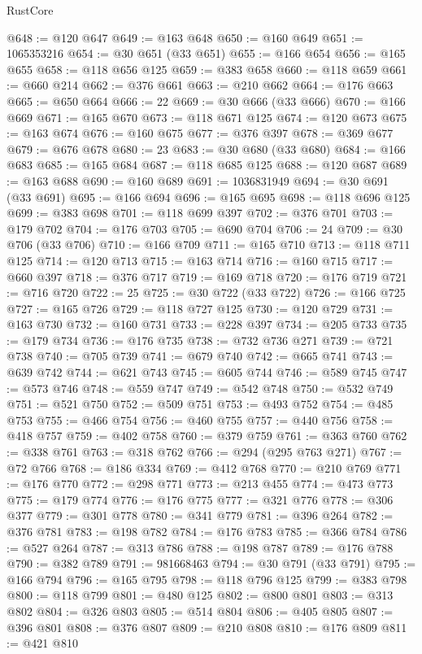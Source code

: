 \begin{lexlean}{RustCore}
\begin{coremodule}
@648 := @120 @647
@649 := @163 @648
@650 := @160 @649
@651 := 1065353216
@654 := @30 @651 (@33 @651)
@655 := @166 @654
@656 := @165 @655
@658 := @118 @656 @125
@659 := @383 @658
@660 := @118 @659
@661 := @660 @214
@662 := @376 @661
@663 := @210 @662
@664 := @176 @663
@665 := @650 @664
@666 := 22
@669 := @30 @666 (@33 @666)
@670 := @166 @669
@671 := @165 @670
@673 := @118 @671 @125
@674 := @120 @673
@675 := @163 @674
@676 := @160 @675
@677 := @376 @397
@678 := @369 @677
@679 := @676 @678
@680 := 23
@683 := @30 @680 (@33 @680)
@684 := @166 @683
@685 := @165 @684
@687 := @118 @685 @125
@688 := @120 @687
@689 := @163 @688
@690 := @160 @689
@691 := 1036831949
@694 := @30 @691 (@33 @691)
@695 := @166 @694
@696 := @165 @695
@698 := @118 @696 @125
@699 := @383 @698
@701 := @118 @699 @397
@702 := @376 @701
@703 := @179 @702
@704 := @176 @703
@705 := @690 @704
@706 := 24
@709 := @30 @706 (@33 @706)
@710 := @166 @709
@711 := @165 @710
@713 := @118 @711 @125
@714 := @120 @713
@715 := @163 @714
@716 := @160 @715
@717 := @660 @397
@718 := @376 @717
@719 := @169 @718
@720 := @176 @719
@721 := @716 @720
@722 := 25
@725 := @30 @722 (@33 @722)
@726 := @166 @725
@727 := @165 @726
@729 := @118 @727 @125
@730 := @120 @729
@731 := @163 @730
@732 := @160 @731
@733 := @228 @397
@734 := @205 @733
@735 := @179 @734
@736 := @176 @735
@738 := @732 @736 @271
@739 := @721 @738
@740 := @705 @739
@741 := @679 @740
@742 := @665 @741
@743 := @639 @742
@744 := @621 @743
@745 := @605 @744
@746 := @589 @745
@747 := @573 @746
@748 := @559 @747
@749 := @542 @748
@750 := @532 @749
@751 := @521 @750
@752 := @509 @751
@753 := @493 @752
@754 := @485 @753
@755 := @466 @754
@756 := @460 @755
@757 := @440 @756
@758 := @418 @757
@759 := @402 @758
@760 := @379 @759
@761 := @363 @760
@762 := @338 @761
@763 := @318 @762
@766 := @294 (@295 @763 @271)
@767 := @72 @766
@768 := @186 @334
@769 := @412 @768
@770 := @210 @769
@771 := @176 @770
@772 := @298 @771
@773 := @213 @455
@774 := @473 @773
@775 := @179 @774
@776 := @176 @775
@777 := @321 @776
@778 := @306 @377
@779 := @301 @778
@780 := @341 @779
@781 := @396 @264
@782 := @376 @781
@783 := @198 @782
@784 := @176 @783
@785 := @366 @784
@786 := @527 @264
@787 := @313 @786
@788 := @198 @787
@789 := @176 @788
@790 := @382 @789
@791 := 981668463
@794 := @30 @791 (@33 @791)
@795 := @166 @794
@796 := @165 @795
@798 := @118 @796 @125
@799 := @383 @798
@800 := @118 @799
@801 := @480 @125
@802 := @800 @801
@803 := @313 @802
@804 := @326 @803
@805 := @514 @804
@806 := @405 @805
@807 := @396 @801
@808 := @376 @807
@809 := @210 @808
@810 := @176 @809
@811 := @421 @810

\end{coremodule}
\end{lexlean}
